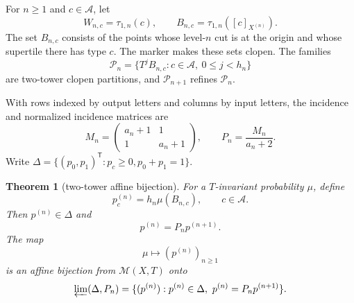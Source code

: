 \documentclass[11pt,a4paper]{amsart}
\newtheorem{theorem}{Theorem}[section]
\theoremstyle{definition}
\theoremstyle{remark}
\newcommand{\A}{\mathcal A}
\newcommand{\Mcal}{\mathcal M}
\begin{document}
For $n\geq1$ and $c\in\A$, let
\[
 W_{n,c}=\tau_{1,n}(c),
 \qquad
 B_{n,c}=\tau_{1,n}([c]_{X^{(n)}}).
\]
The set $B_{n,c}$ consists of the points whose level-$n$ cut is at the
origin and whose supertile there has type $c$.  The marker makes these sets
clopen.  The families
\begin{equation}\label{eq:towers}
 \mathcal P_n=
 \{T^jB_{n,c}:c\in\A,\ 0\leq j<h_n\}
\end{equation}
are two-tower clopen partitions, and $\mathcal P_{n+1}$ refines
$\mathcal P_n$.

With rows indexed by output letters and columns by input letters, the
incidence and normalized incidence matrices are
\begin{equation}\label{eq:matrices}
 M_n=
 \begin{pmatrix}a_n+1&1\\[2pt]1&a_n+1\end{pmatrix},
 \qquad
 P_n=\frac{M_n}{a_n+2}.
\end{equation}
Write $\Delta=\{(p_0,p_1)^{\mathsf T}:p_c\geq0, p_0+p_1=1\}$.

\begin{theorem}[two-tower affine bijection]\label{thm:towers}
For a $T$-invariant probability $\mu$, define
\begin{equation}\label{eq:towerweights}
 p_c^{(n)}=h_n\mu(B_{n,c}),
 \qquad c\in\A.
\end{equation}
Then $p^{(n)}\in\Delta$ and
\begin{equation}\label{eq:compatibility}
 p^{(n)}=P_np^{(n+1)}.
\end{equation}
The map
\begin{equation}\label{eq:affine-map}
 \mu\longmapsto (p^{(n)})_{n\geq1}
\end{equation}
is an affine bijection from $\Mcal(X,T)$ onto
\[
 \varprojlim(\Delta,P_n)
 =\{(p^{(n)}):p^{(n)}\in\Delta,
                    \ p^{(n)}=P_np^{(n+1)}\}.
\]
\end{theorem}
\end{document}
